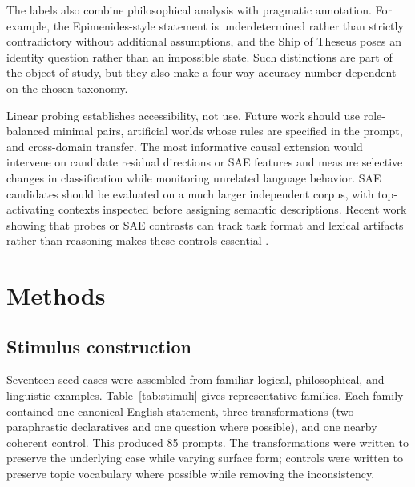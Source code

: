 \documentclass[pdflatex,sn-nature]{sn-jnl}
\begin{document}
The labels also combine philosophical analysis with pragmatic annotation. For example, the Epimenides-style statement is underdetermined rather than strictly contradictory without additional assumptions, and the Ship of Theseus poses an identity question rather than an impossible state. Such distinctions are part of the object of study, but they also make a four-way accuracy number dependent on the chosen taxonomy.

Linear probing establishes accessibility, not use. Future work should use role-balanced minimal pairs, artificial worlds whose rules are specified in the prompt, and cross-domain transfer. The most informative causal extension would intervene on candidate residual directions or SAE features and measure selective changes in classification while monitoring unrelated language behavior. SAE candidates should be evaluated on a much larger independent corpus, with top-activating contexts inspected before assigning semantic descriptions. Recent work showing that probes or SAE contrasts can track task format and lexical artifacts rather than reasoning makes these controls essential \cite{sahoo2026,ma2026}.

\section{Methods}\label{sec:methods}

\subsection{Stimulus construction}

Seventeen seed cases were assembled from familiar logical, philosophical, and linguistic examples. Table~\ref{tab:stimuli} gives representative families. Each family contained one canonical English statement, three transformations (two paraphrastic declaratives and one question where possible), and one nearby coherent control. This produced 85 prompts. The transformations were written to preserve the underlying case while varying surface form; controls were written to preserve topic vocabulary where possible while removing the inconsistency.
\end{document}
